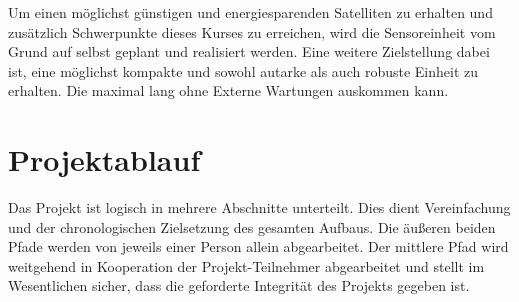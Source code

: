 Um einen möglichst günstigen und energiesparenden Satelliten zu erhalten und zusätzlich Schwerpunkte dieses Kurses zu erreichen, wird die Sensoreinheit vom Grund auf selbst geplant und realisiert werden.
Eine weitere  Zielstellung dabei ist, eine möglichst kompakte und sowohl autarke als auch robuste Einheit zu erhalten.
Die maximal lang ohne Externe Wartungen auskommen kann.

\section{Projektablauf}
Das Projekt ist logisch in mehrere Abschnitte unterteilt. Dies dient Vereinfachung und der chronologischen Zielsetzung des gesamten Aufbaus.
Die äußeren beiden Pfade werden von jeweils einer Person allein abgearbeitet.
Der mittlere Pfad wird weitgehend in Kooperation der Projekt-Teilnehmer abgearbeitet
und stellt im Wesentlichen sicher, dass die geforderte Integrität des Projekts gegeben ist.
\\

